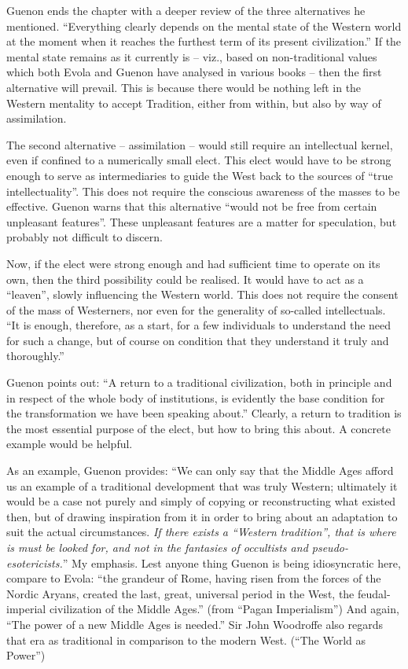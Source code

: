 Guenon ends the chapter with a deeper review of the three alternatives he mentioned. ``Everything clearly depends on the mental state of the Western world at the moment when it reaches the furthest term of its present civilization.'' If the mental state remains as it currently is -- viz., based on non-traditional values which both Evola and Guenon have analysed in various books -- then the first alternative will prevail. This is because there would be nothing left in the Western mentality to accept Tradition, either from within, but also by way of assimilation.

The second alternative -- assimilation -- would still require an intellectual kernel, even if confined to a numerically small elect. This elect would have to be strong enough to serve as intermediaries to guide the West back to the sources of ``true intellectuality''. This does not require the conscious awareness of the masses to be effective. Guenon warns that this alternative ``would not be free from certain unpleasant features''. These unpleasant features are a matter for speculation, but probably not difficult to discern.

Now, if the elect were strong enough and had sufficient time to operate on its own, then the third possibility could be realised. It would have to act as a ``leaven'', slowly influencing the Western world. This does not require the consent of the mass of Westerners, nor even for the generality of so-called intellectuals. ``It is enough, therefore, as a start, for a few individuals to understand the need for such a change, but of course on condition that they understand it truly and thoroughly.''

Guenon points out: ``A return to a traditional civilization, both in principle and in respect of the whole body of institutions, is evidently the base condition for the transformation we have been speaking about.'' Clearly, a return to tradition is the most essential purpose of the elect, but how to bring this about. A concrete example would be helpful.

As an example, Guenon provides: ``We can only say that the Middle Ages afford us an example of a traditional development that was truly Western; ultimately it would be a case not purely and simply of copying or reconstructing what existed then, but of drawing inspiration from it in order to bring about an adaptation to suit the actual circumstances. \emph{If there exists a ``Western tradition'', that is where is must be looked for, and not in the fantasies of occultists and pseudo-esotericists.}'' My emphasis. Lest anyone thing Guenon is being idiosyncratic here, compare to Evola: ``the grandeur of Rome, having risen from the forces of the Nordic Aryans, created the last, great, universal period in the West, the feudal-imperial civilization of the Middle Ages.'' (from ``Pagan Imperialism'') And again, ``The power of a new Middle Ages is needed.'' Sir John Woodroffe also regards that era as traditional in comparison to the modern West. (``The World as Power'')

